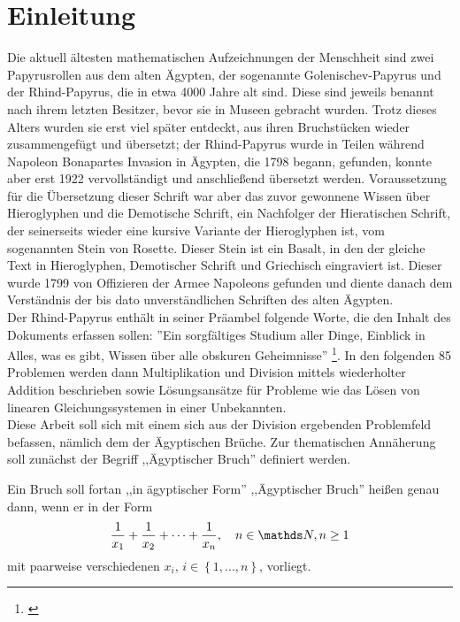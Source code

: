 \section{Einleitung}\label{sec:arithmetic}
Die aktuell ältesten mathematischen Aufzeichnungen der Menschheit sind zwei Papyrusrollen aus dem alten Ägypten, der sogenannte Golenischev-Papyrus und der Rhind-Papyrus, die in etwa 4000 Jahre alt sind. Diese sind jeweils benannt nach ihrem letzten Besitzer, bevor sie in Museen gebracht wurden. Trotz dieses Alters wurden sie erst viel später entdeckt, aus ihren Bruchstücken wieder zusammengefügt und übersetzt; der Rhind-Papyrus wurde in Teilen während Napoleon Bonapartes Invasion in Ägypten, die 1798 begann, gefunden, konnte aber erst 1922 vervollständigt und anschließend übersetzt werden. Voraussetzung für die Übersetzung dieser Schrift war aber das zuvor gewonnene Wissen über Hieroglyphen und die Demotische Schrift, ein Nachfolger der Hieratischen Schrift, der seinerseits wieder eine kursive Variante der Hieroglyphen ist, vom sogenannten Stein von Rosette. Dieser Stein ist ein Basalt, in den der gleiche Text in Hieroglyphen, Demotischer Schrift und Griechisch eingraviert ist. Dieser wurde 1799 von Offizieren der Armee Napoleons gefunden und diente danach dem Verständnis der bis dato unverständlichen Schriften des alten Ägypten.\cite[S.33 ff]{Burton2011}\\
Der Rhind-Papyrus enthält in seiner Präambel folgende Worte, die den Inhalt des Dokuments erfassen sollen: ''Ein sorgfältiges Studium aller Dinge, Einblick in Alles, was es gibt, Wissen über alle obskuren Geheimnisse'' \footnote{\cite[S. 37, Übersetzung durch den Autor]{Burton2011}}. In den folgenden 85 Problemen werden dann Multiplikation und Division mittels wiederholter Addition beschrieben sowie Lösungsansätze für Probleme wie das Lösen von linearen Gleichungssystemen in einer Unbekannten.\\
Diese Arbeit soll sich mit einem sich aus der Division ergebenden Problemfeld befassen, nämlich dem der Ägyptischen Brüche. Zur thematischen Annäherung soll zunächst der Begriff  ,,Ägyptischer Bruch'' definiert werden.
\begin{def1}\label{def:egypfrac}
	Ein Bruch soll fortan ,,in ägyptischer Form'' \bzw\xspace,,Ägyptischer Bruch'' heißen genau dann, wenn er in der Form
	$$\uf{x_1} + \uf{x_2} + \cdots + \uf{x_n}, \quad n \in \N, n \ge 1$$
	mit paarweise verschiedenen $x_i, \, i \in \left\{1,...,n\right\}$, vorliegt.
\end{def1}

